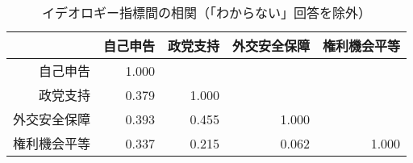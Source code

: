 \begin{table}[ht]
\centering
\caption{イデオロギー指標間の相関（「わからない」回答を除外）} 
\begin{tabular}{rrrrr}
  \hline
 & 自己申告 & 政党支持 & 外交安全保障 & 権利機会平等 \\ 
  \hline
自己申告 & 1.000 &  &  &  \\ 
  政党支持 & 0.379 & 1.000 &  &  \\ 
  外交安全保障 & 0.393 & 0.455 & 1.000 &  \\ 
  権利機会平等 & 0.337 & 0.215 & 0.062 & 1.000 \\ 
   \hline
\end{tabular}
\end{table}

